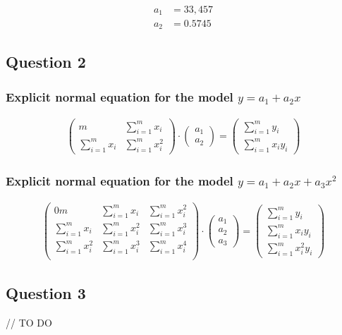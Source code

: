\begin{equation}
	\begin{aligned}    
		a_1 &= 33,457\\
		a_2 &= 0.5745
	\end{aligned}
\end{equation}

\subsection{Question 2}

\subsubsection{Explicit normal equation for the model $y = a_1 + a_2x$}

\begin{equation}
	\begin{aligned}
		\begin{pmatrix}
			m & \displaystyle\sum_{i=1}^{m} x_i\\
			\displaystyle\sum_{i=1}^{m} x_i & \displaystyle\sum_{i=1}^{m} x_i^2
		\end{pmatrix}
		\cdot
		\begin{pmatrix}
			a_1\\
			a_2
		\end{pmatrix}=
		\begin{pmatrix}
			\displaystyle\sum_{i=1}^{m} y_i\\
			\displaystyle\sum_{i=1}^{m} x_iy_i
		\end{pmatrix}
	\end{aligned}
\end{equation}

\subsubsection{Explicit normal equation for the model $y = a_1 + a_2x + a_3x^2$}

\begin{equation}
	\begin{aligned}
		\begin{pmatrix}
			0m & \displaystyle\sum_{i=1}^{m} x_i & \displaystyle\sum_{i=1}^{m} x_i^2\\
			\displaystyle\sum_{i=1}^{m} x_i & \displaystyle\sum_{i=1}^{m} x_i^2 & \displaystyle\sum_{i=1}^{m} x_i^3\\
			\displaystyle\sum_{i=1}^{m} x_i^2 & \displaystyle\sum_{i=1}^{m} x_i^3 & \displaystyle\sum_{i=1}^{m} x_i^4\\
		\end{pmatrix}
		\cdot
		\begin{pmatrix}
			a_1\\
			a_2\\
			a_3
		\end{pmatrix}=
		\begin{pmatrix}
			\displaystyle\sum_{i=1}^{m} y_i\\
			\displaystyle\sum_{i=1}^{m} x_iy_i\\
			\displaystyle\sum_{i=1}^{m} x_i^2y_i
		\end{pmatrix}
	\end{aligned}
\end{equation}


\subsection{Question 3}

// TO DO